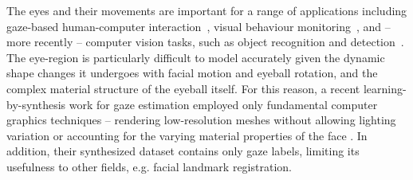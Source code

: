The eyes and their movements are important for a range of applications including gaze-based human-computer interaction~\cite{majaranta14_apc}, visual behaviour monitoring~\cite{bulling13_chi,bulling11_pami}, and -- more recently -- computer vision tasks, such as object recognition and detection~\cite{yun2013studying,papadopoulos2014training,karthikeyan2013and}.
The eye-region is particularly difficult to model accurately given the dynamic shape changes it undergoes with facial motion and eyeball rotation, and the complex material structure of the eyeball itself.
For this reason, a recent learning-by-synthesis work for gaze estimation employed only fundamental computer graphics techniques -- rendering low-resolution meshes without allowing lighting variation or accounting for the varying material properties of the face \citet{sugano2014learning}.
In addition, their synthesized dataset contains only gaze labels, limiting its usefulness to other fields, e.g. facial landmark registration.






